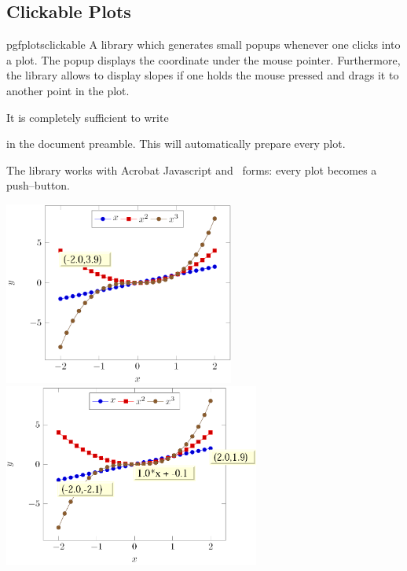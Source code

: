 \subsection{Clickable Plots}
\begin{tikzlibrary}{pgfplotsclickable}
	A library which generates small popups whenever one clicks into a plot. The popup displays the coordinate under the mouse pointer. Furthermore, the library allows to display slopes if one holds the mouse pressed and drags it to another point in the plot.

	It is completely sufficient to write
\begin{codeexample}
\usetikzlibrary{pgfplotsclickable}
\end{codeexample}
	\noindent in the document preamble. This will automatically prepare every plot.

	The library works with Acrobat Javascript and \pdf\ forms: every plot becomes a push--button. 

	\includegraphics[height=6cm]{figures/pgfplotsclickable-fig1.png}
	\includegraphics[height=6cm]{figures/pgfplotsclickable-fig2.png}


\end{tikzlibrary}
